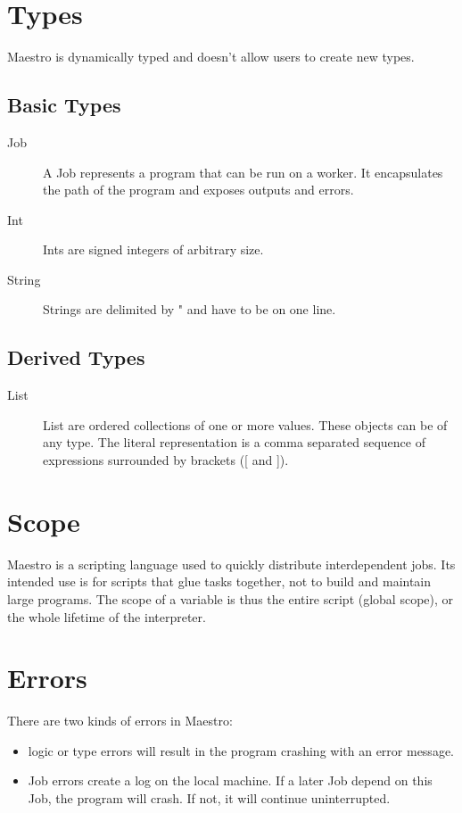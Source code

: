 \section{Types}
Maestro is dynamically typed and doesn't allow users to create new types.
\subsection{Basic Types}
\begin{description}
  \item[Job] A Job represents a program that can be run on a worker. It
   encapsulates the path of the program and exposes outputs and errors.
  \item[Int] Ints are signed integers of arbitrary size.
  \item[String] Strings are delimited by " and have to be on one line.
\end{description}

\subsection{Derived Types}
\begin{description}
  \item[List] List are ordered collections of one or more values. These
    objects can be of any type. The literal representation is a
    comma separated sequence of expressions surrounded by brackets ([ and ]).
\end{description}

\section{Scope}
Maestro is a scripting language used to quickly distribute interdependent jobs.
Its intended use is for scripts that glue tasks together, not to build and
maintain large programs. The scope of a variable is thus the entire script
(global scope), or the whole lifetime of the interpreter.

\section{Errors}
There are two kinds of errors in Maestro:
\begin{itemize}
  \item logic or type errors will result in the program crashing with an error
  message.
  \item Job errors create a log on the local machine. If a later Job depend
  on this Job, the program will crash. If not, it will continue uninterrupted.
\end{itemize}

